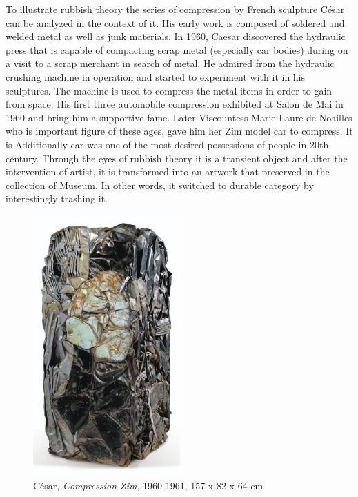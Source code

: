To illustrate rubbish theory the series of compression by French sculpture César can be analyzed in the context of it. His early work is composed of soldered and welded metal as well as junk materials. In 1960, Caesar discovered the hydraulic press that is capable of compacting scrap metal (especially car bodies) during on a visit to a scrap merchant in search of metal. He admired from the hydraulic crushing machine in operation and started to experiment with it in his sculptures. The machine is used to compress the metal items in order to gain from space. His first three automobile compression exhibited at Salon de Mai in 1960 and bring him a supportive fame. Later Viscountess Marie-Laure de Noailles who is important figure of these ages, gave him her Zim model car to compress. It is 
 Additionally car was one of the most desired possessions of people in 20th century. Through the eyes of rubbish theory it is a transient object and after the intervention of artist, it is transformed into an artwork that preserved in the collection of Museum. In other words, it switched to durable category by interestingly trashing it. 


\begin{figure}[h!]
  \centering
  \includegraphics[height=10cm]{graphics/Cesar_Zim.jpg}
  \caption{César, \textit{Compression Zim}, 1960-1961, 157 x 82 x 64 cm}
  \label{fig:Cesar_Zim}
\end{figure}

